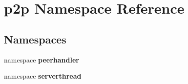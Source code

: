 \section{p2p Namespace Reference}
\label{namespacep2p}


\subsection*{Namespaces}
\begin{CompactItemize}
\item 
namespace {\bf peerhandler}
\item 
namespace {\bf serverthread}
\end{CompactItemize}
